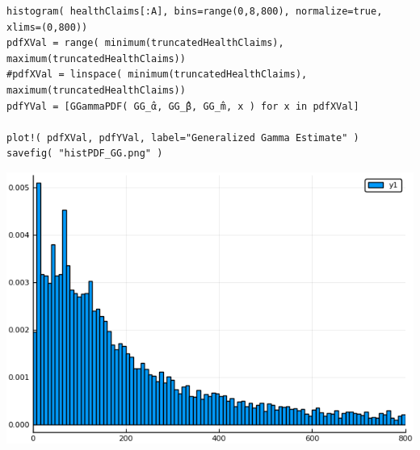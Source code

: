 \documentclass[12pt, letterpaper]{paper}
\begin{document}
\begin{verbatim}
histogram( healthClaims[:A], bins=range(0,8,800), normalize=true, xlims=(0,800))
pdfXVal = range( minimum(truncatedHealthClaims), maximum(truncatedHealthClaims))
#pdfXVal = linspace( minimum(truncatedHealthClaims), maximum(truncatedHealthClaims))
pdfYVal = [GGammaPDF( GG_̂α, GG_̂β, GG_̂m, x ) for x in pdfXVal]

plot!( pdfXVal, pdfYVal, label="Generalized Gamma Estimate" )
savefig( "histPDF_GG.png" )
\end{verbatim}

\begin{center}
\includegraphics[width=.9\linewidth]{histPDF_GG.png}
\end{center}
\end{document}
